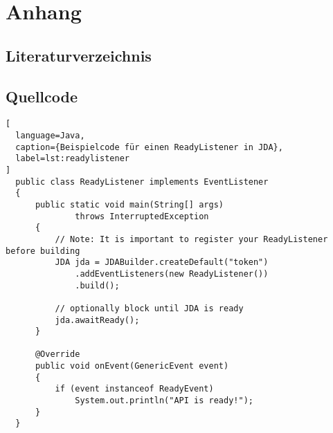 
\cleardoublepage
{}
\setcounter{page}{\thesavepage}

\appendix
\section{Anhang}\label{anhang}

\label{glossar}
\printglossaries
\cleardoublepage

\subsection{Literaturverzeichnis}\label{literaturverzeichnis}

\printbibliography[heading=none]
\cleardoublepage

\subsection{Quellcode}\label{quellcode}

\begin{lstlisting}[
  language=Java,
  caption={Beispielcode für einen ReadyListener in JDA},
  label=lst:readylistener
]
  public class ReadyListener implements EventListener
  {
      public static void main(String[] args)
              throws InterruptedException
      {
          // Note: It is important to register your ReadyListener before building
          JDA jda = JDABuilder.createDefault("token")
              .addEventListeners(new ReadyListener())
              .build();
  
          // optionally block until JDA is ready
          jda.awaitReady();
      }
  
      @Override
      public void onEvent(GenericEvent event)
      {
          if (event instanceof ReadyEvent)
              System.out.println("API is ready!");
      }
  }  
\end{lstlisting}